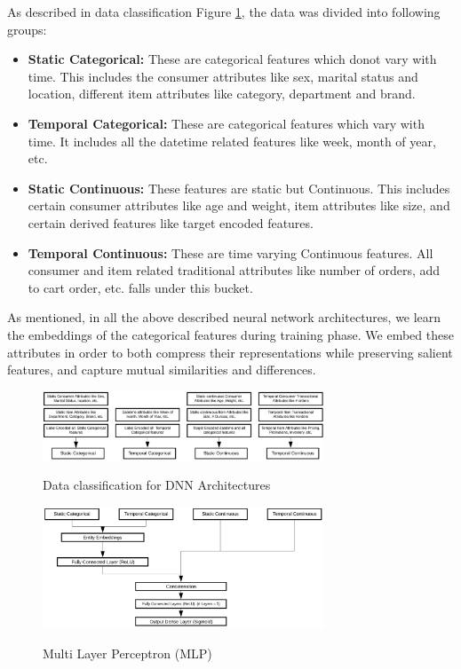 As described in data classification Figure \ref{fig:dnndata}, the data was divided into following groups:
\begin{itemize}
\item {\bf Static Categorical:} These are categorical features which donot vary with time. This includes the consumer
attributes like sex, marital status and location, different item attributes like category, department and brand.
\item {\bf Temporal Categorical:} These are categorical features which vary with time. It includes all the datetime 
related features like week, month of year, etc.
\item {\bf Static Continuous:} These features are static but Continuous. This includes certain consumer attributes like
age and weight, item attributes like size, and certain derived features like target encoded features.
\item {\bf Temporal Continuous:} These are time varying Continuous features. All consumer and item related
traditional attributes like number of orders, add to cart order, etc. falls under this bucket.
\end{itemize}
As mentioned, in all the above described neural network architectures, we learn the embeddings \cite{guo2016entity} of the 
categorical features during training phase. We embed these attributes in order to both compress their representations 
while preserving salient features, and capture mutual similarities and differences.
  \begin{figure}[t]
    \centering 
    \caption{Data classification for DNN Architectures} 
    \includegraphics[width=3.3in]{img/dnndata.png} 
    \label{fig:dnndata} 
  \end{figure}
  \begin{figure}[t]
    \centering 
    \caption{Multi Layer Perceptron (MLP)} 
    \includegraphics[width=3.3in]{img/MLP.png} 
    \label{fig:MLP} 
  \end{figure}

